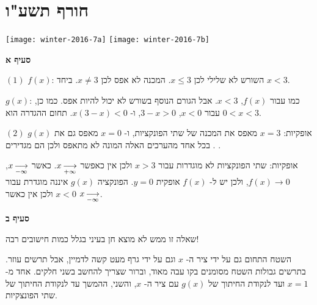 
\section{חורף תשע"ו}

\begin{center}
\texttt{[image: winter-2016-7a]}
\texttt{[image: winter-2016-7b]}
\end{center}

\vspace{-2ex}

\textbf{סעיף א}

$(1)$
$f(x)$:
השורש לא שלילי לכן
$x\leq 3$.
המכנה לא אפס לכן
$x\neq 3$.
ביחד
$x<3$.

$g(x)$:
כמו עבור 
$f(x)$,
$x<3$.
אבל הגורם הנוסף בשורש לא יכול להיות אפס. כמו כן, עבור
$x<0$,
$3-x>0$,
ו-%
$x(3-x)<0$.
תחום ההגדרה הוא
$0<x<3$.

$(2)$
\asms{}
אופקיות: 
$x=3$
מאפס את המכנה של שתי הפונקציות, ו-%
$x=0$
מאפס גם את 
$g(x)$.
בכל אחד מהערכים האלה המונה לא מתאפס ולכן הם מגדירים 
\asms{}.

\asms{}
אופקיות: שתי הפונקציות לא מוגדרות עבור
$x>3$
ולכן אין
\asms{}
כאפשר
$x\mathop{\longrightarrow}\limits_{+\infty}$.
כאשר
$x\mathop{\longrightarrow}\limits_{-\infty}$,
$f(x)\rightarrow 0$,
ולכן יש ל-%
$f(x)$
\asm{}
אופקית 
$y=0$.
הפונקציה 
$g(x)$
איננה מוגדרת עבור
$x<0$
ולכן אין 
\asm{}
כאשר 
$x\mathop{\longrightarrow}\limits_{-\infty}$.

\np

\textbf{סעיף ב}

שאלה זו ממש לא מוצא חן בעיני בגלל כמות חישובים רבה!

השטח התחום גם על ידי ציר ה-%
$x$
וגם על ידי גרף מעט קשה לדמיין, אבל תרשים עוזר. בתרשים גבולות השטח מסומנים בקו עבה מאוד, וברור שצריך להחשב בשני חלקים. אחד מ-%
$x=1$
ועד לנקודת החיתוך של
$g(x)$
עם ציר ה-%
$x$,
והשני, ההמשך עד לנקודת החיתוך של שתי הפונצקיות.


